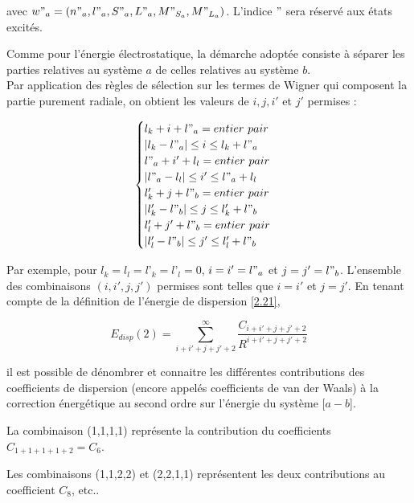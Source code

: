 	\noindent avec $w"_{a} = (n"_{a}, l"_{a}, S"_{a}, L"_{a}, M"_{S_{a}}, M"_{L_{a}})$. L'indice \og $"$ \fg{} sera réservé aux états excités. 
	
	Comme pour l'énergie électrostatique, la démarche adoptée consiste à séparer les parties relatives au système $a$ de celles relatives au système $b$. \\
	
	Par application des règles de sélection sur les termes de Wigner qui composent la partie purement radiale, on obtient les valeurs de $i, j, i'$ et $j'$ permises :
	
	\begin{equation}
	\begin{cases}
	l_{k} + i + l"_{a} = entier\ pair \\
	|l_{k} - l"_{a}| \leq i \leq l_{k} + l"_{a} \\
	l"_{a} + i' + l_{l} = entier\ pair \\
	|l"_{a} - l_{l}| \leq i' \leq l"_{a} + l_{l} \\
	l'_{k} + j + l"_{b} = entier\ pair \\
	|l'_{k} - l"_{b}| \leq j \leq l'_{k} + l"_{b} \\
	l'_{l} + j' + l"_{b} = entier\ pair \\
	|l'_{l} - l"_{b}| \leq j' \leq l'_{l} + l"_{b}
	\end{cases}
	\end{equation}
	
	Par exemple, pour $l_{k}=l_{l}=l’_{k}=l’_{l}=0$, $i=i'=l"_{a}$ et $j=j'=l"_{b}$. L'ensemble des combinaisons $(i, i', j, j')$ permises sont telles que $i=i'$ et $j=j'$. En tenant compte de la définition de l'énergie de dispersion \ref{2.21},
	
	\begin{equation}
	E_{disp}(2) = \sum_{i+i'+j+j'+2}^{\infty} \frac{C_{i+i'+j+j'+2}}{R^{i+i'+j+j'+2}}
	\end{equation}
	
	il est possible de dénombrer et connaitre les différentes contributions des coefficients de dispersion (encore appelés coefficients de van der Waals) à la correction énergétique au second ordre sur l'énergie du système [$a - b$].
	
	La combinaison (1,1,1,1) représente la contribution du coefficients $C_{1+1+1+1+2} = C_{6}$.
	
	Les combinaisons (1,1,2,2) et (2,2,1,1) représentent les deux contributions au coefficient $C_{8}$, etc..
	
